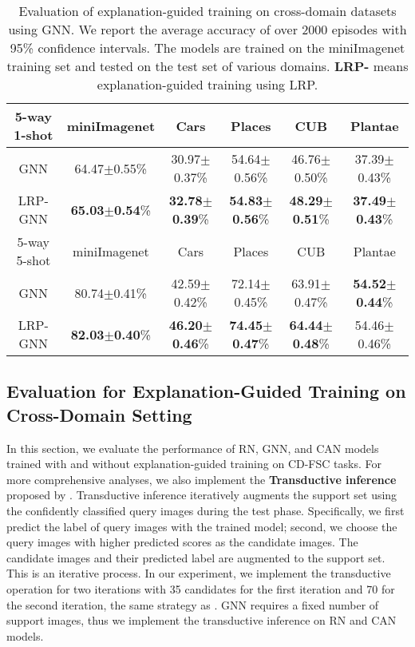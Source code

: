 \documentclass[a4paper,conference]{IEEEtran}
\begin{document}
\begin{table*}[tb]
    \centering
\caption{Evaluation of explanation-guided training on cross-domain datasets using GNN. We report the average accuracy of over 2000 episodes with 95\% confidence intervals. The models are trained on the miniImagenet training set and tested on the test set of various domains. \textbf{LRP-} means explanation-guided training using LRP.}
    \begin{tabular}{c c c c c c}
    \hline
        5-way 1-shot  &miniImagenet             &  Cars           & Places         & CUB          & Plantae\\ \hline
        GNN           &64.47$\pm$0.55\%           & 30.97$\pm$0.37\%  &54.64$\pm$0.56\%  &46.76$\pm$0.50\%& 37.39$\pm$0.43\%\\
        LRP-GNN       &\textbf{65.03}$\pm$\textbf{0.54}\%  & \textbf{32.78}$\pm$\textbf{0.39}\%  & \textbf{54.83}$\pm$\textbf{0.56}\% &\textbf{48.29}$\pm$\textbf{0.51}\%& \textbf{37.49}$\pm$\textbf{0.43}\%\\
        \hline \hline
        5-way 5-shot  &miniImagenet             &  Cars           & Places         & CUB          & Plantae\\ \hline
        GNN           &80.74$\pm$0.41\%           & 42.59$\pm$0.42\%  & 72.14$\pm$0.45\%  & 63.91$\pm$0.47\%& \textbf{54.52}$\pm$\textbf{0.44}\%\\
        LRP-GNN       &\textbf{82.03}$\pm$\textbf{0.40}\%  & \textbf{46.20}$\pm$\textbf{0.46}\%  & \textbf{74.45}$\pm$\textbf{0.47}\% &\textbf{64.44}$\pm$\textbf{0.48}\% & 54.46$\pm$0.46\% \\
        \hline
    \end{tabular}
    \label{tab:GNNaccuracy}
\end{table*}

\subsection{Evaluation for Explanation-Guided Training on Cross-Domain Setting}
\label{sec:experiment_singledomain}
In this section, we evaluate the performance of RN, GNN, and CAN models trained with and without explanation-guided training on CD-FSC tasks. For more comprehensive analyses, we also implement the \textbf{Transductive inference} proposed by \cite{CAN:hou2019cross}. 
Transductive inference iteratively augments the support set using the confidently classified query images during the test phase. Specifically, we first predict the label of query images with the trained model; second, we choose the query images with higher predicted scores as the candidate images. The candidate images and their predicted label are augmented to the support set. This is an iterative process. In our experiment, we implement the transductive operation for two iterations with 35 candidates for the first iteration and 70 for the second iteration, the same strategy as \cite{CAN:hou2019cross}. GNN requires a fixed number of support images, thus we implement the transductive inference on RN and CAN models.
\end{document}
